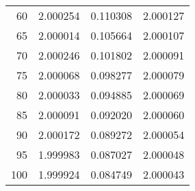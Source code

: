 \begin{tabular}{rrrr}
  60 &         2.000254 &        0.110308 &                     2.000127 \\
  65 &         2.000014 &        0.105664 &                     2.000107 \\
  70 &         2.000246 &        0.101802 &                     2.000091 \\
  75 &         2.000068 &        0.098277 &                     2.000079 \\
  80 &         2.000033 &        0.094885 &                     2.000069 \\
  85 &         2.000091 &        0.092020 &                     2.000060 \\
  90 &         2.000172 &        0.089272 &                     2.000054 \\
  95 &         1.999983 &        0.087027 &                     2.000048 \\
 100 &         1.999924 &        0.084749 &                     2.000043 \\
\bottomrule
\end{tabular}
